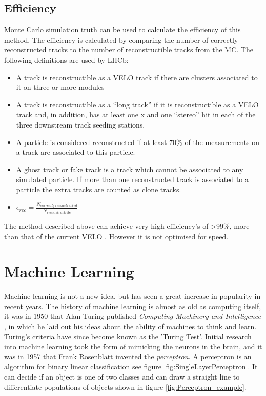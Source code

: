 \subsection{Efficiency}
Monte Carlo simulation truth can be used to calculate the efficiency of this method. The efficiency is calculated by comparing the number of correctly reconstructed tracks to the number of reconstructible tracks from the MC. The following definitions are used by LHCb:

\begin{itemize}
    \item A track is reconstructible as a VELO track if there are clusters associated to it on three or more modules
    \item A track is reconstructible as a “long track” if it is reconstructible as a VELO track and, in addition, has at least one x and one “stereo” hit in each of the three downstream track seeding stations.
    \item A particle is considered reconstructed if at least 70\% of the measurements on a track are associated to this particle.
    \item A ghost track or fake track is a track which cannot be associated to any simulated particle.  If more than one reconstructed track is associated to a particle the extra tracks are counted as clone tracks.
    \item $\epsilon_{rec}=\frac{N_{correctly\ reconstructed}}{N_{reconstructible}}$
\end{itemize}
The method described above can achieve very high efficiency's of >99\%, more than that of the current VELO \cite{Collaboration:1624070}. However it is not optimised for speed.





\section{Machine Learning}  %
Machine learning is not a new idea, but has seen a great increase in popularity in recent years. The history of machine learning is almost as old as computing itself, it was in 1950 that Alan Turing published \textit{Computing Machinery and Intelligence} \cite{TURING1950I.COMPUTINGINTELLIGENCE}, in which he laid out his ideas about the ability of machines to think and learn. Turing's criteria have since become known as the 'Turing Test'. Initial research into machine learning took the form of mimicking the neurons in the brain, and it was in 1957 that Frank Rosenblatt invented the \textit{perceptron}. A perceptron is an algorithm for binary linear classification see figure \ref{fig:SingleLayerPerceptron}. It can decide if an object is one of two classes and can draw a straight line to differentiate populations of objects shown in figure \ref{fig:Perceptron_example}.  

